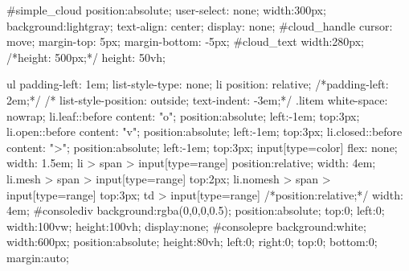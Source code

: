            #simple_cloud{
                position:absolute;
                user-select: none;
                width:300px;
                background:lightgray;
                text-align: center;
                display: none;
            }
            #cloud_handle{
                cursor: move;
                margin-top: 5px;
                margin-bottom: -5px;
            }
            #cloud_text{
                width:280px;
                /*height: 500px;*/
                height: 50vh;
            }
            
            ul{
                padding-left: 1em;
                list-style-type: none;
            }
            li{
                position: relative;
                /*padding-left: 2em;*/
/*                list-style-position: outside;
                text-indent: -3em;*/
            }
            .litem{
                white-space: nowrap;
            }
            li.leaf::before{
                content: "o";
                position:absolute;
                left:-1em;
                top:3px;
            }
            li.open::before{
                content: "v";
                position:absolute;
                left:-1em;
                top:3px;
            }
            li.closed::before{
                content: ">";
                position:absolute;
                left:-1em;
                top:3px;
            }
            input[type=color]{
                flex: none;
                width: 1.5em;
            }
            li > span > input[type=range]{
                position:relative;
                width: 4em;
            }
            li.mesh > span > input[type=range]{
                top:2px;
            }
            li.nomesh > span > input[type=range]{
                top:3px;
            }
            td > input[type=range]{
    /*position:relative;*/
           width: 4em;
            }
            #consolediv{
                background:rgba(0,0,0,0.5);
                position:absolute;
                top:0;
                left:0;
                width:100vw;
                height:100vh;
                display:none;
            }
            #consolepre{
                background:white;
                width:600px;
                position:absolute;
                height:80vh;
                left:0;
                right:0;
                top:0;
                bottom:0;
                margin:auto;
            }




